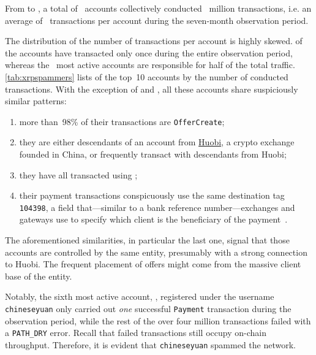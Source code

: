 From \startdate to \finishdate, a total of~ accounts collectively conducted~ million transactions, i.e. an average of~ transactions per account during the seven-month observation period.

The distribution of the number of transactions per account is highly skewed.
 of the accounts have transacted only once during the entire observation period, whereas the~ most active accounts are responsible for half of the total traffic.
\autoref{tab:xrpspammers} lists of the top~10 accounts by the number of conducted transactions.
With the exception of  and , all these accounts share suspiciously similar patterns:
\begin{enumerate}
    \item more than~98\% of their transactions are \texttt{OfferCreate};
    \item they are either descendants of an account from \href{https://www.huobi.com/}{Huobi}, a crypto exchange founded in China, or frequently transact with descendants from Huobi;
    \item they have all transacted using ;
    \item their payment transactions conspicuously use the same destination tag \texttt{104398}, a field that---similar to a bank reference number---exchanges and gateways use to specify which client is the beneficiary of the payment~\cite{XRPLedger2020b}.
\end{enumerate}
%
The aforementioned similarities, in particular the last one, signal that those accounts are controlled by the same entity, presumably with a strong connection to Huobi.
The frequent placement of offers might come from the massive client base of the entity.

Notably, the sixth most active account, , registered under the username \texttt{chineseyuan} only carried out \textit{one} successful \texttt{Payment} transaction during the observation period, while the rest of the over four million transactions failed with a \texttt{PATH\_DRY} error. Recall that failed transactions still occupy on-chain throughput. Therefore, it is evident that \texttt{chineseyuan} spammed the network.



